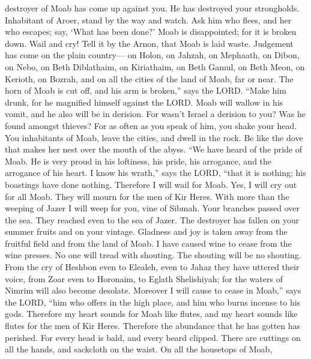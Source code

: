 destroyer of Moab has come up against you. He has destroyed your
strongholds.  Inhabitant of Aroer, stand by the way and
watch. Ask him who flees, and her who escapes; say, `What has been
done?'  Moab is disappointed; for it is broken down. Wail
and cry! Tell it by the Arnon, that Moab is laid waste. 
Judgement has come on the plain country--- on Holon, on Jahzah, on
Mephaath,  on Dibon, on Nebo, on Beth Diblathaim,
 on Kiriathaim, on Beth Gamul, on Beth Meon, 
on Kerioth, on Bozrah, and on all the cities of the land of Moab, far or
near.  The horn of Moab is cut off, and his arm is
broken,'' says the LORD.  ``Make him drunk, for he
magnified himself against the LORD. Moab will wallow in his vomit, and
he also will be in derision.  For wasn't Israel a derision
to you? Was he found amongst thieves? For as often as you speak of him,
you shake your head.  You inhabitants of Moab, leave the
cities, and dwell in the rock. Be like the dove that makes her nest over
the mouth of the abyss.  ``We have heard of the pride of
Moab. He is very proud in his loftiness, his pride, his arrogance, and
the arrogance of his heart.  I know his wrath,'' says the
LORD, ``that it is nothing; his boastings have done nothing.
 Therefore I will wail for Moab. Yes, I will cry out for
all Moab. They will mourn for the men of Kir Heres.  With
more than the weeping of Jazer I will weep for you, vine of Sibmah. Your
branches passed over the sea. They reached even to the sea of Jazer. The
destroyer has fallen on your summer fruits and on your vintage.
 Gladness and joy is taken away from the fruitful field and
from the land of Moab. I have caused wine to cease from the wine
presses. No one will tread with shouting. The shouting will be no
shouting.  From the cry of Heshbon even to Elealeh, even to
Jahaz they have uttered their voice, from Zoar even to Horonaim, to
Eglath Shelishiyah; for the waters of Nimrim will also become desolate.
 Moreover I will cause to cease in Moab,'' says the LORD,
``him who offers in the high place, and him who burns incense to his
gods.  Therefore my heart sounds for Moab like flutes, and
my heart sounds like flutes for the men of Kir Heres. Therefore the
abundance that he has gotten has perished.  For every head
is bald, and every beard clipped. There are cuttings on all the hands,
and sackcloth on the waist.  On all the housetops of Moab,
